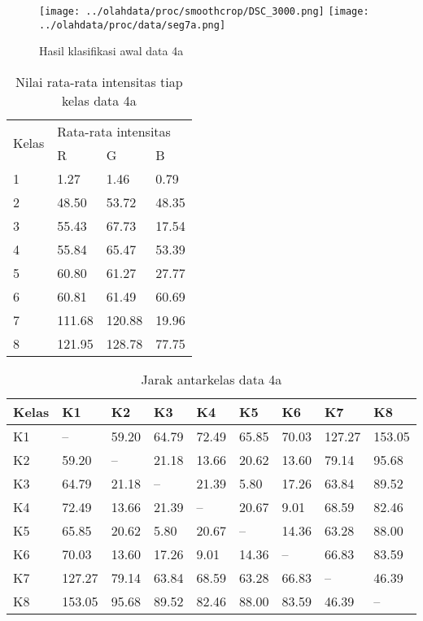 \documentclass[laporan.tex]{subfiles}
\begin{document}
\begin{figure}[h!]
\centering
\texttt{[image: ../olahdata/proc/smoothcrop/DSC\_3000.png]}
\texttt{[image: ../olahdata/proc/data/seg7a.png]}
\caption{Hasil klasifikasi awal data 4a}
\end{figure}

\begin{table}[h!]
\centering
\begin{tabular}{|l|l|l|l|}
\cline{1-4}
\multirow{2}{*}{Kelas} & \multicolumn{3}{l|}{Rata-rata intensitas} \\
\cline{2-4}
 & R & G & B \\
\cline{1-4}
1 & 1.27 & 1.46 & 0.79 \\
2 & 48.50 & 53.72 & 48.35 \\
3 & 55.43 & 67.73 & 17.54 \\
4 & 55.84 & 65.47 & 53.39 \\
5 & 60.80 & 61.27 & 27.77 \\
6 & 60.81 & 61.49 & 60.69 \\
7 & 111.68 & 120.88 & 19.96 \\
8 & 121.95 & 128.78 & 77.75 \\
\cline{1-4}
\end{tabular}
\caption{Nilai rata-rata intensitas tiap kelas data 4a}
\label{table:avggreen1}
\end{table}

\begin{table}[h!]
\centering
\begin{tabular}{|l|l|l|l|l|l|l|l|l|}
\hline
Kelas & K1 & K2 & K3 & K4 & K5 & K6 & K7 & K8 \\
\hline
K1 & -- & 59.20 & 64.79 & 72.49 & 65.85 & 70.03 & 127.27 & 153.05 \\
K2 & 59.20 & -- & 21.18 & 13.66 & 20.62 & 13.60 & 79.14 & 95.68 \\
K3 & 64.79 & 21.18 & --	& 21.39 & 5.80 & 17.26 & 63.84 & 89.52 \\
K4 & 72.49 & 13.66 & 21.39 & --	& 20.67 & 9.01 & 68.59 & 82.46 \\
K5 & 65.85 & 20.62 & 5.80 & 20.67 & -- & 14.36 & 63.28 & 88.00 \\
K6 & 70.03 & 13.60 & 17.26 & 9.01 & 14.36 & -- & 66.83 & 83.59 \\
K7 & 127.27 & 79.14 & 63.84 & 68.59 & 63.28 & 66.83 & -- & 46.39 \\
K8 & 153.05 & 95.68 & 89.52 & 82.46 & 88.00 & 83.59 & 46.39 & -- \\
\hline
\end{tabular}
\caption{Jarak antarkelas data 4a}
\label{table:distgreen}
\end{table}
\end{document}
